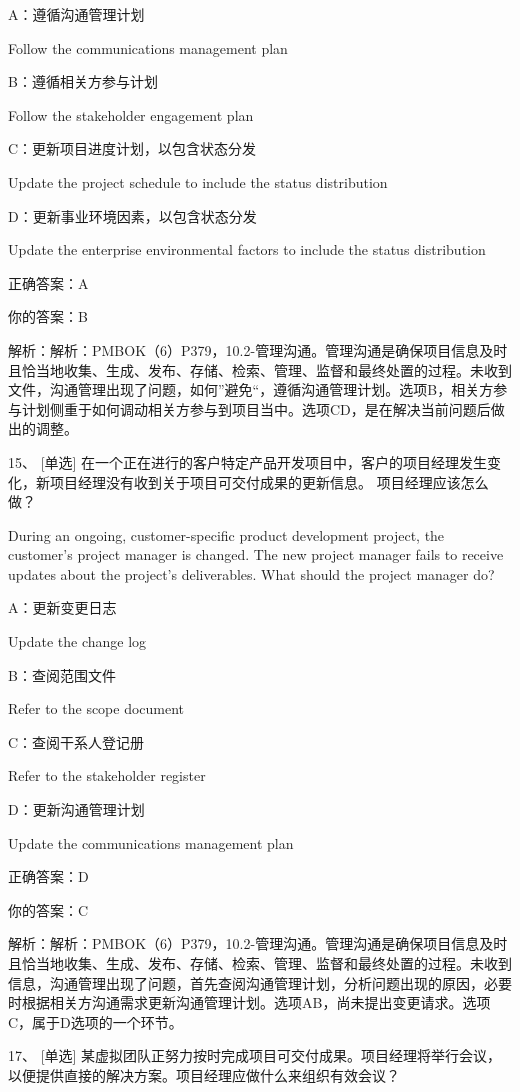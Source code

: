 A：遵循沟通管理计划

Follow the communications management plan

B：遵循相关方参与计划

Follow the stakeholder engagement plan

C：更新项目进度计划，以包含状态分发

Update the project schedule to include the status distribution

D：更新事业环境因素，以包含状态分发

Update the enterprise environmental factors to include the status distribution

正确答案：A

你的答案：B

解析：解析：PMBOK（6）P379，10.2-管理沟通。管理沟通是确保项目信息及时且恰当地收集、生成、发布、存储、检索、管理、监督和最终处置的过程。未收到文件，沟通管理出现了问题，如何”避免“，遵循沟通管理计划。选项B，相关方参与计划侧重于如何调动相关方参与到项目当中。选项CD，是在解决当前问题后做出的调整。


15、 [单选] 在一个正在进行的客户特定产品开发项目中，客户的项目经理发生变化，新项目经理没有收到关于项目可交付成果的更新信息。 项目经理应该怎么做？

During an ongoing, customer-specific product development project, the customer's project manager is changed. The new project manager fails to receive updates about the project's deliverables. What should the project manager do?

A：更新变更日志

Update the change log

B：查阅范围文件

Refer to the scope document

C：查阅干系人登记册

Refer to the stakeholder register

D：更新沟通管理计划

Update the communications management plan

正确答案：D

你的答案：C

解析：解析：PMBOK（6）P379，10.2-管理沟通。管理沟通是确保项目信息及时且恰当地收集、生成、发布、存储、检索、管理、监督和最终处置的过程。未收到信息，沟通管理出现了问题，首先查阅沟通管理计划，分析问题出现的原因，必要时根据相关方沟通需求更新沟通管理计划。选项AB，尚未提出变更请求。选项C，属于D选项的一个环节。


17、 [单选] 某虚拟团队正努力按时完成项目可交付成果。项目经理将举行会议，以便提供直接的解决方案。项目经理应做什么来组织有效会议？

